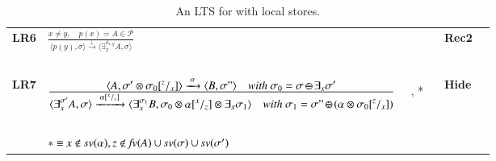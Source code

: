 \documentclass[main.tex]{subfiles}
\begin{document}
\begin{table}[t]
\begin{center}
{\begin{tabular}{llll}
					\mbox{\bf LR6}&$\frac {\displaystyle x \neq y, \quad \displaystyle p(x) = A \in  \mathcal{P} }
					{\displaystyle\langle p(y),\sigma\rangle \xrightarrow{\;  \bot \;} \langle \exists_x^{\delta_{x,y}} A, \sigma\rangle}$ 
					&\bf{Rec2}&
				
				
				
				\\
				&\mbox{   }&
				\\				
				\mbox{\bf LR7}&$\frac {\displaystyle \la A, \sigma' \otimes \sigma_0[^z/_x] \ra \xrightarrow{\;  \alpha \;} 
					\la B,  \sigma" \ra\ \ \ \mbox{  \textit{with}  } \sigma_0 = \sigma \odiv \exists_x \sigma'}   
				{\displaystyle\la \exists^{\sigma'}_x A, \sigma\ra \xrightarrow{\;  \alpha[^x/_z] \;} 
					\la \exists^{\sigma_1}_x B, \sigma_0 \otimes \alpha[^x/_z] \otimes \exists_x\sigma_1 \ra
					\ \ \ \mbox{  \textit{with}  } \sigma_1 = \sigma" \odiv (\alpha \otimes \sigma_0[^z/_x])}$ \ \ , * \; \
				&\bf{Hide}&\\
				&\mbox{   }&
				\\
				&\footnotesize$* \equiv {\it x\not\in sv(\alpha), z \not\in fv(A) \cup sv(\sigma)\cup sv(\sigma') }$&
			\end{tabular}
		}
	\end{center}
	\caption{An LTS for \SCCP with local stores.}
	\label{fig:LTSlocal}
\end{table}
\def\odiv{\, {\ominus\hspace{-6.8pt} \div} \,}
\def\odivvv{\; {\ominus\hspace{-4.7pt} \div} \;}
\end{document}
